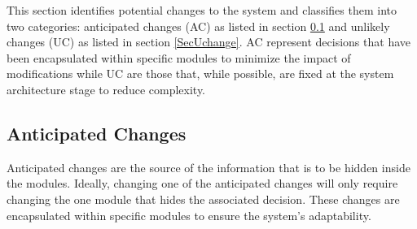 \documentclass[12pt, titlepage]{article}
\begin{document}
This section identifies potential changes to the system and classifies them into
two categories: anticipated changes (AC) as listed in section \ref{SecAchange} and
unlikely changes (UC) as listed in section \ref{SecUchange}. AC represent decisions 
that have been encapsulated within specific modules to minimize the impact of 
modifications while UC are those that, while possible, are fixed at the system 
architecture stage to reduce complexity.

\subsection{Anticipated Changes} \label{SecAchange}

Anticipated changes are the source of the information that is to be hidden
inside the modules. Ideally, changing one of the anticipated changes will only
require changing the one module that hides the associated decision. These changes
are encapsulated within specific modules to ensure the system's adaptability.
\end{document}
